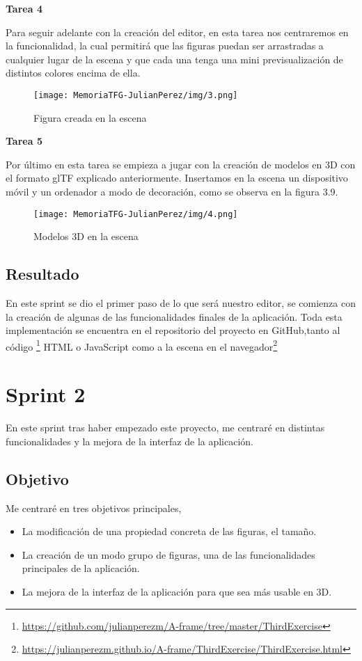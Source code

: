 \documentclass[a4paper, 12pt]{book}
\begin{document}
\textbf{Tarea 4}

Para seguir adelante con la creación del editor, en esta tarea nos centraremos en la funcionalidad, la cual permitirá que las figuras puedan ser arrastradas a cualquier lugar de la escena y que cada una tenga una mini previsualización de distintos colores encima de ella.          
\begin{figure}[H]
  \centering
  \texttt{[image: MemoriaTFG-JulianPerez/img/3.png]}
  \caption{Figura creada en la escena}\label{scrum}
\end{figure}

\textbf{Tarea 5}

Por último en esta tarea se empieza a jugar con la creación de modelos en 3D con el formato glTF explicado anteriormente. Insertamos en la escena un dispositivo móvil y un ordenador a modo de decoración, como se observa en la figura 3.9.
\begin{figure}[H]
  \centering
  \texttt{[image: MemoriaTFG-JulianPerez/img/4.png]}
  \caption{Modelos 3D en la escena}\label{scrum}
\end{figure}

\subsection{Resultado}
En este sprint se dio el primer paso de lo que será nuestro editor, se comienza con la creación de algunas de las funcionalidades finales de la aplicación. Toda esta implementación se encuentra en el repositorio del proyecto en GitHub,tanto al código \footnote{\url{https://github.com/julianperezm/A-frame/tree/master/ThirdExercise}} HTML o JavaScript como a la escena en el navegador\footnote{\url{https://julianperezm.github.io/A-frame/ThirdExercise/ThirdExercise.html}}

\section{Sprint 2}
En este sprint tras haber empezado este proyecto, me centraré en distintas funcionalidades y la mejora de la interfaz de la aplicación.

\subsection{Objetivo}
Me centraré en tres objetivos principales, 

\begin{itemize}
    \item La modificación de una propiedad concreta de las figuras, el tamaño.
    \item La creación de un modo grupo de figuras, una de las funcionalidades principales de la aplicación.
    \item La mejora de la interfaz de la aplicación para que sea más usable en 3D.
\end{itemize}
\end{document}
